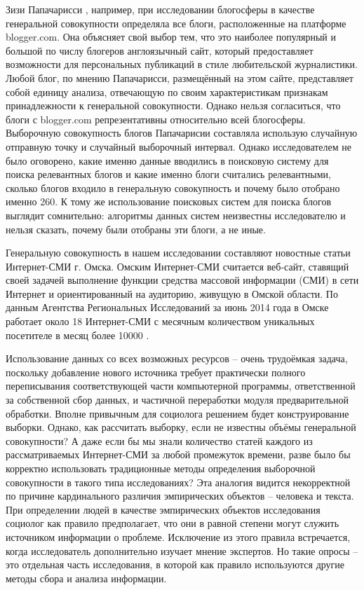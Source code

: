 Зизи Папачарисси \cite{zizi}, например, при исследовании блогосферы в качестве генеральной совокупности определяла все блоги, расположенные на платформе blogger.com. Она объясняет свой выбор тем, что это наиболее популярный и большой по числу блогеров англоязычный сайт, который предоставляет возможности для персональных публикаций в стиле любительской журналистики. Любой блог, по мнению Папачарисси, размещённый на этом сайте, представляет собой единицу анализа, отвечающую по своим характеристикам признакам принадлежности к генеральной совокупности. Однако нельзя согласиться, что блоги с blogger.com репрезентативны относительно всей блогосферы. Выборочную совокупность блогов Папачарисии составляла использую случайную отправную точку и случайный выборочный интервал. Однако исследователем не было оговорено, какие именно данные вводились в поисковую систему для поиска релевантных блогов и какие именно блоги считались релевантными, сколько блогов входило в генеральную совокупность и почему было отобрано именно 260. К тому же использование поисковых систем для поиска блогов выглядит сомнительно: алгоритмы данных систем неизвестны исследователю и нельзя сказать, почему были отобраны эти блоги, а не иные.

Генеральную совокупность в нашем исследовании составляют новостные статьи Интернет-СМИ г. Омска. Омским Интернет-СМИ считается веб-сайт, ставящий своей задачей выполнение функции средства массовой информации (СМИ) в сети Интернет и ориентированный на аудиторию, живущую в Омской области. По данным Агентства Региональных Исследований за июнь 2014 года в Омске работает около 18 Интернет-СМИ с месячным количеством уникальных посетителе в месяц более 10000 \cite{ari_rating}.

Использование данных со всех возможных ресурсов -- очень трудоёмкая задача, поскольку добавление нового источника требует практически полного переписывания соответствующей части компьютерной программы, ответственной за собственной сбор данных, и частичной переработки модуля предварительной обработки. Вполне привычным для социолога решением будет конструирование выборки. Однако, как рассчитать выборку, если не известны объёмы генеральной совокупности? А даже если бы мы знали количество статей каждого из рассматриваемых Интернет-СМИ за любой промежуток времени, разве было бы корректно использовать традиционные методы определения выборочной совокупности в такого типа исследованиях? Эта аналогия видится некорректной по причине кардинального различия эмпирических объектов -- человека и текста. При определении людей в качестве эмпирических объектов исследования социолог как правило предполагает, что они в равной степени могут служить источником информации о проблеме. Исключение из этого правила встречается, когда исследователь дополнительно изучает мнение экспертов. Но такие опросы -- это отдельная часть исследования, в которой как правило используются другие методы сбора и анализа информации.

